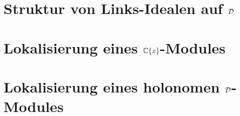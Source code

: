 \begin{comment}
  \subsection{Weyl Algebra als Graduierter Ring}
  Sei $A$ nun einer der drei Koeffizienten Ringe, welche zuvor behandelt wurden.
  Der Ring $A<\partial_x>$ kommt zusammen mit einer aufsteigenden Filtrierung,
  welche wir mit $F(A<\partial_x)$ bezeichen werden.
  Sei $P$ ein bzgl. \ref{prop:weyl_eindeutige_schreibung} minimal geschriebener
  Operator, so ist $P$ in $F_k$ falls der maximale Grad von $\partial_x$ in $P$
  kleiner oder gleich $k$. So definiere den Grad $deg P$ von $P$ als die 
  Eindeutige ganze Zahl $k$ mit $P\in F_kA<\partial_x>\slash F_{k-1}<\partial_x>$

  Unabhängigkeit von Schreibung wird in Sabbah Script behauptet
\end{comment}

\section{Struktur von Links-Idealen auf ${\mathcal{D}}$}

\section{Lokalisierung eines ${\mathbb C}\{x\}$-Modules} %

\section{Lokalisierung eines holonomen ${\mathcal{D}}$-Modules}


